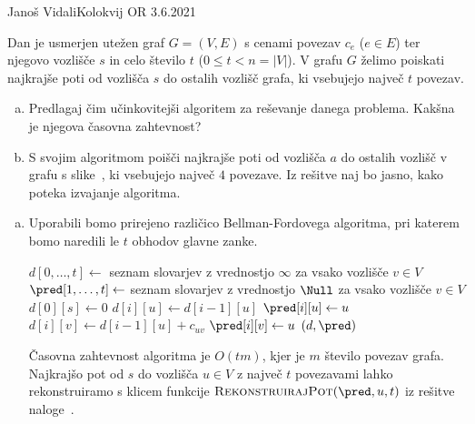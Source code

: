 \begin{naloga}{Janoš Vidali}{Kolokvij OR 3.6.2021}
\begin{vprasanje}
Dan je usmerjen utežen graf $G = (V, E)$ s cenami povezav $c_e$ ($e \in E$)
ter njegovo vozlišče $s$ in celo število $t$ ($0 \le t < n = |V|$).
V grafu $G$ želimo poiskati najkrajše poti
od vozlišča $s$ do ostalih vozlišč grafa,
ki vsebujejo največ $t$ povezav.

\begin{enumerate}[(a)]
\item Predlagaj čim učinkovitejši algoritem za reševanje danega problema.
Kakšna je njegova časovna zahtevnost?

\item S svojim algoritmom poišči najkrajše poti
od vozlišča $a$ do ostalih vozlišč v grafu s slike~\fig,
ki vsebujejo največ $4$ povezave.
Iz rešitve naj bo jasno, kako poteka izvajanje algoritma.
\end{enumerate}
%
\begin{slika}
\makebox[\textwidth][c]{
\pgfslika
}
\end{slika}
\end{vprasanje}

\begin{odgovor}
\begin{enumerate}[(a)]
\item Uporabili bomo prirejeno različico Bellman-Fordovega algoritma,
pri katerem bomo naredili le $t$ obhodov glavne zanke.
\begin{small}
\begin{algorithmic}
    \State $d[0, \dots, t] \gets$ seznam slovarjev z vrednostjo $\infty$ za vsako vozlišče $v \in V$
    \State $\pred[1, \dots, t] \gets$ seznam slovarjev z vrednostjo $\Null$
	za vsako vozlišče $v \in V$
    \State $d[0][s] \gets 0$
            \State $d[i][u] \gets d[i-1][u]$
            \State $\pred[i][u] \gets u$
        \EndFor
                \State $d[i][v] \gets d[i-1][u] + c_{uv}$
                \State $\pred[i][v] \gets u$
            \EndIf
        \EndFor
    \EndFor
    \State \Return $(d, \pred)$
\EndFunction
\end{algorithmic}
\end{small}
Časovna zahtevnost algoritma je $O(tm)$,
kjer je $m$ število povezav grafa.
Najkrajšo pot od $s$ do vozlišča $u \in V$ z največ $t$ povezavami
lahko rekonstruiramo s klicem funkcije
$\text{\sc RekonstruirajPot}(\pred, u, t)$ iz rešitve naloge~\res[poslovnez].


\end{enumerate}
\end{odgovor}
\end{naloga}
